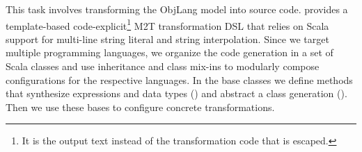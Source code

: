 
\enlargethispage{20mm}

This task involves transforming the ObjLang model into source code.
\SIGMA provides a template-based code-explicit\footnote{It is the output text instead of the transformation code that is escaped.} M2T transformation DSL that relies on Scala support for multi-line string literal and string interpolation.
%
Since we target multiple programming languages, we organize the code generation in a set of Scala classes and use inheritance and class mix-ins to modularly compose configurations for the respective languages.
In the base classes we define methods that synthesize expressions and data types (\href{https://github.com/fikovnik/ttc14-fixml-sigma/blob/master/ttc14-fixml-base/src/fr/inria/spirals/sigma/ttc14/fixml/BaseObjLangMTT.scala}{}) and abstract a class generation (\href{https://github.com/fikovnik/ttc14-fixml-sigma/blob/master/ttc14-fixml-base/src/fr/inria/spirals/sigma/ttc14/fixml/BaseObjLang2Class.scala}{}).
Then we use these bases to configure concrete transformations.

